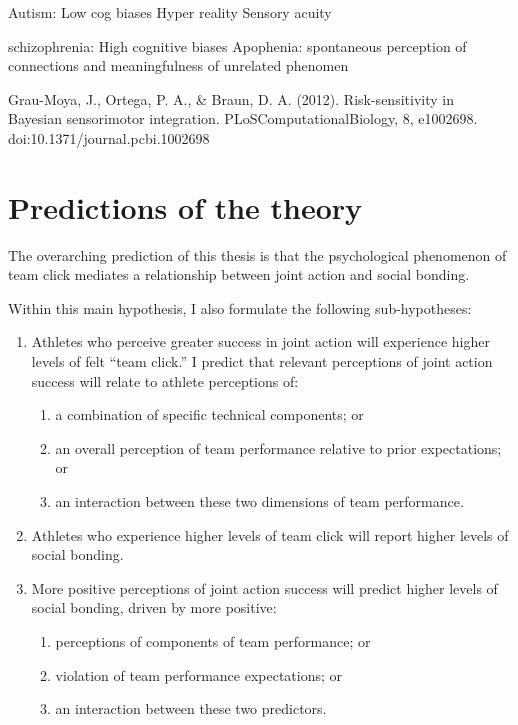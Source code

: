 \begin{CJK}{UTF8}{gbsn}
Autism:
Low cog biases
Hyper reality
Sensory acuity

schizophrenia:
High cognitive biases
Apophenia: spontaneous perception of connections and meaningfulness of unrelated phenomen


Grau-Moya, J., Ortega, P. A., & Braun, D. A. (2012). Risk-sensitivity in Bayesian sensorimotor integration. PLoSComputationalBiology, 8, e1002698. doi:10.1371/journal.pcbi.1002698







\section{Predictions of the theory}


    The overarching prediction of this thesis is that the psychological phenomenon of team click mediates a relationship between joint action and social bonding.

    Within this main hypothesis, I also formulate the following sub-hypotheses:
    \begin{enumerate}
      \item Athletes who perceive greater success in joint action will experience higher levels of felt ``team click.'' I predict that relevant perceptions of joint action success will relate to athlete perceptions of:
        \begin{enumerate}
          \item a combination of specific technical components; or
          \item an overall perception of team performance relative to prior expectations; or
          \item an interaction between these two dimensions of team performance.
        \end{enumerate}
      \item Athletes who experience higher levels of team click will report higher levels of social bonding.
      \item More positive perceptions of joint action success will predict higher levels of social bonding, driven by more positive:
      \begin{enumerate}
        \item perceptions of components of team performance; or
        \item violation of team performance expectations; or
        \item an interaction between these two predictors.
      \end{enumerate}
    \end{enumerate}


\end{CJK}
